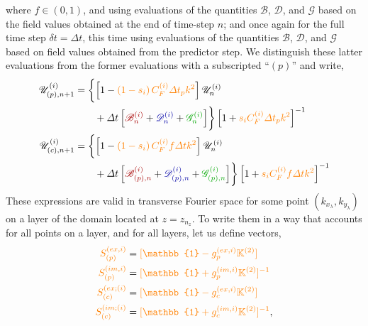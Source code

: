 \documentclass[12pt]{memoir}
\newcommand{\bfield}{\mathscr{B}}
\newcommand{\dfield}{\mathscr{D}}
\newcommand{\gfield}{\mathscr{G}}
\newcommand{\ufield}{\mathscr{U}}
\begin{document}
where $f\in (0,1)$, and using evaluations of the quantities 
{\color{red!65!black}$\bfield$},
{\color{blue!65!black}$\dfield$}, 
and 
{\color{green!65!black}$\gfield$} 
based on the field values obtained at the end of time-step $n$; 
and once again for the full time step $\delta t= \Delta t$, 
this time using evaluations of the quantities
{\color{red!65!black}$\bfield$},
{\color{blue!65!black}$\dfield$}, 
and 
{\color{green!65!black}$\gfield$} 
based on field values obtained from the predictor step. 
We distinguish these latter evaluations from the former 
evaluations with a subscripted ``$(p)$'' and write,
%
\begin{subequations}
\begin{align}
  \ufield_{(p),n+1}^{(i)} &= \biggl\{
  \left[ 1 - {\color{orange}\left(1-s_i\right)C^{(i)}_F \Delta t_p k^2}\right] \ufield^{(i)}_n  \nonumber \\
  &\qquad + \Delta t\left[ {\color{red!65!black}\bfield^{(i)}_n} +
  {\color{blue!65!black}\dfield^{(i)}_n}+{\color{green!65!black}\gfield^{(i)}_n}\right]
                    \biggr\}
                    \left[1+{\color{orange}s_iC^{(i)}_F \Delta t_p k^2}\right]^{-1} \\
  \ufield_{(c),n+1}^{(i)} &= \biggl\{
  \left[ 1 - {\color{orange}\left(1-s_i\right)C^{(i)}_F f\Delta t k^2}\right] \ufield^{(i)}_n  \nonumber \\
  &\qquad + \Delta t\left[{\color{red!65!black}\bfield^{(i)}_{(p),n}} +
  {\color{blue!65!black}\dfield^{(i)}_{(p),n}}+{\color{green!65!black}\gfield^{(i)}_{(p),n}}\right]
                    \biggr\}
                    \left[1+{\color{orange}s_iC^{(i)}_F f\Delta t k^2}\right]^{-1}
\end{align}
\end{subequations}
%
These expressions are valid in transverse Fourier space for 
some point $(k_{x_\lambda},k_{y_\lambda})$ on a layer of 
the domain located at $z=z_{n_z}$. To write them in a way
that accounts for all points on a layer, and for all layers, 
let us define vectors,
%
\begin{subequations}
\begin{align}
  { \color{orange} S^{(ex,i)}_{(p)} }  &= {\color{orange}[\mathbb{1} - g^{(ex,i)}_{p} \mathbb{K}^{(2)}]      }  \label{eq:defsexp} \\
  { \color{orange} S^{(im,i)}_{(p)} }  &= {\color{orange}[\mathbb{1} + g^{(im,i)}_{p} \mathbb{K}^{(2)}]^{-1} }  \label{eq:defsimp} \\
  { \color{orange} S^{(ex;(i)}_{(c)} } &= {\color{orange}[\mathbb{1} - g^{(ex,i)}_{c} \mathbb{K}^{(2)}]      }  \label{eq:defsexc} \\
  { \color{orange} S^{(im;(i)}_{(c)} } &= {\color{orange}[\mathbb{1} + g^{(im,i)}_{c} \mathbb{K}^{(2)}]^{-1} }, \label{eq:defsimc}
\end{align}
\end{subequations}
\end{document}
